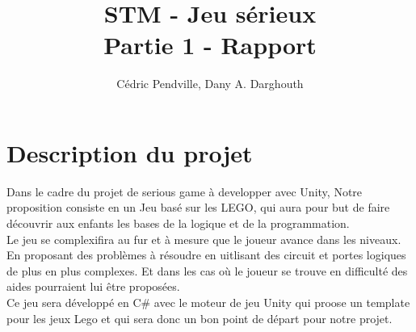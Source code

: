 \documentclass{article}
\title{\textbf{STM - Jeu sérieux\\Partie 1 - Rapport}}
\author{Cédric Pendville, Dany A. Darghouth}
\date{}
\begin{document}
\maketitle


\section{Description du projet}
Dans le cadre du projet de serious game à developper avec Unity, Notre proposition consiste en un Jeu basé sur les LEGO, qui aura pour but de faire découvrir aux enfants les bases de la logique et de la programmation.\\ 

Le jeu se complexifira au fur et à mesure que le joueur avance dans les niveaux. En proposant des problèmes à résoudre en uitlisant des circuit et portes logiques de plus en plus complexes. Et dans les cas où le joueur se trouve en difficulté des aides pourraient lui être proposées.\\

Ce jeu sera développé en C\# avec le moteur de jeu Unity qui proose un template pour les jeux Lego et qui sera donc un bon point de départ pour notre projet.\\
\end{document}
